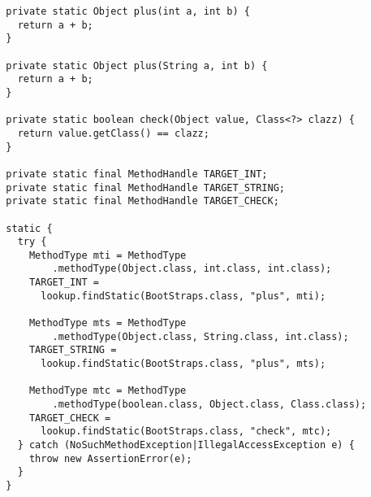 {\scriptsize \begin{verbatim}
  private static Object plus(int a, int b) {
    return a + b;
  }

  private static Object plus(String a, int b) {
    return a + b;
  }

  private static boolean check(Object value, Class<?> clazz) {
    return value.getClass() == clazz;
  }

  private static final MethodHandle TARGET_INT;
  private static final MethodHandle TARGET_STRING;
  private static final MethodHandle TARGET_CHECK;

  static {
    try {
      MethodType mti = MethodType
          .methodType(Object.class, int.class, int.class);
      TARGET_INT =
        lookup.findStatic(BootStraps.class, "plus", mti);

      MethodType mts = MethodType
          .methodType(Object.class, String.class, int.class);
      TARGET_STRING =
        lookup.findStatic(BootStraps.class, "plus", mts);

      MethodType mtc = MethodType
          .methodType(boolean.class, Object.class, Class.class);
      TARGET_CHECK =
        lookup.findStatic(BootStraps.class, "check", mtc);
    } catch (NoSuchMethodException|IllegalAccessException e) {
      throw new AssertionError(e);
    }
  }
\end{verbatim} }
